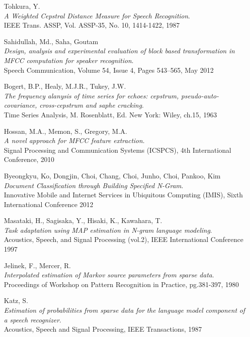 \begin{thebibliography}{99}
  {\sc Tohkura,} Y.\\
  \emph{A Weighted Cepstral Distance Measure for Speech Recognition}.\\
  IEEE Trans. ASSP, Vol. ASSP-35, No. 10, 1414-1422, 1987

  {\sc Sahidullah,} Md., {\sc Saha,} Goutam\\
  \emph{Design, analysis and experimental evaluation of block based transformation in MFCC computation for speaker recognition}.\\
  Speech Communication, Volume 54, Issue 4, Pages 543–565, May 2012
  
  {\sc Bogert,} B.P., {\sc Healy,} M.J.R., {\sc Tukey,} J.W.\\
  \emph{The frequency alanysis of time series for echoes: cepstrum, pseudo-auto-covariance, cross-cepstrum and saphe cracking}.\\
  Time Series Analysis, M. Rosenblatt, Ed. New York: Wiley, ch.15, 1963

  {\sc Hossan,} M.A., {\sc Memon,} S., {\sc Gregory,} M.A.\\
  \emph{A novel approach for MFCC feature extraction}.\\
  Signal Processing and Communication Systems (ICSPCS), 4th International Conference, 2010
  
  {\sc Byeongkyu,} Ko, {\sc Dongjin,} Choi, {\sc Chang,} Choi, {\sc Junho,} Choi, {\sc Pankoo,} Kim\\
  \emph{Document Classification through Building Specified N-Gram}.\\
  Innovative Mobile and Internet Services in Ubiquitous Computing (IMIS), Sixth International Conference 2012

  {\sc Masataki,} H., {\sc Sagisaka,} Y., {\sc Hisaki,} K., {\sc Kawahara,} T.\\
  \emph{Task adaptation using MAP estimation in N-gram language modeling}.\\
  Acoustics, Speech, and Signal Processing (vol.2), IEEE International Conference 1997

  {\sc Jelinek,} F., {\sc Mercer,} R.\\
  \emph{Interpolated estimation of Markov source parameters from sparse data}.\\
  Proceedings of Workshop on Pattern Recognition in Practice, pg.381-397, 1980

  {\sc Katz,} S.\\
  \emph{Estimation of probabilities from sparse data for the language model component of a speech recognizer}.\\
  Acoustics, Speech and Signal Processing, IEEE Transactions, 1987


\end{thebibliography}
